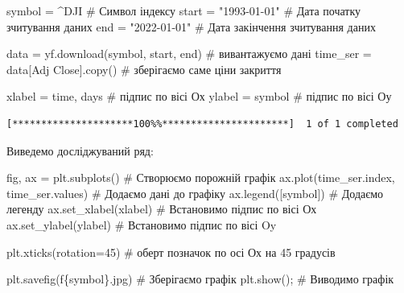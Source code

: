 \documentclass[
  letterpaper,
]{report}
\newenvironment{Shaded}{\begin{snugshade}}{\end{snugshade}}
\newcommand{\CommentTok}[1]{\textcolor[rgb]{0.37,0.37,0.37}{#1}}
\newcommand{\DecValTok}[1]{\textcolor[rgb]{0.68,0.00,0.00}{#1}}
\newcommand{\NormalTok}[1]{\textcolor[rgb]{0.00,0.23,0.31}{#1}}
\newcommand{\OperatorTok}[1]{\textcolor[rgb]{0.37,0.37,0.37}{#1}}
\newcommand{\SpecialCharTok}[1]{\textcolor[rgb]{0.37,0.37,0.37}{#1}}
\newcommand{\SpecialStringTok}[1]{\textcolor[rgb]{0.13,0.47,0.30}{#1}}
\newcommand{\StringTok}[1]{\textcolor[rgb]{0.13,0.47,0.30}{#1}}
\begin{document}
\begin{Shaded}
\begin{Highlighting}[]
\NormalTok{symbol }\OperatorTok{=} \StringTok{\textquotesingle{}\^{}DJI\textquotesingle{}}          \CommentTok{\# Символ індексу}
\NormalTok{start }\OperatorTok{=} \StringTok{"1993{-}01{-}01"}     \CommentTok{\# Дата початку зчитування даних}
\NormalTok{end }\OperatorTok{=} \StringTok{"2022{-}01{-}01"}       \CommentTok{\# Дата закінчення зчитування даних}

\NormalTok{data }\OperatorTok{=}\NormalTok{ yf.download(symbol, start, end)  }\CommentTok{\# вивантажуємо дані}
\NormalTok{time\_ser }\OperatorTok{=}\NormalTok{ data[}\StringTok{\textquotesingle{}Adj Close\textquotesingle{}}\NormalTok{].copy()     }\CommentTok{\# зберігаємо саме ціни закриття}

\NormalTok{xlabel }\OperatorTok{=} \StringTok{\textquotesingle{}time, days\textquotesingle{}}    \CommentTok{\# підпис по вісі Ох }
\NormalTok{ylabel }\OperatorTok{=}\NormalTok{ symbol          }\CommentTok{\# підпис по вісі Оу}
\end{Highlighting}
\end{Shaded}

\begin{verbatim}
[*********************100%%**********************]  1 of 1 completed
\end{verbatim}

Виведемо досліджуваний ряд:

\begin{Shaded}
\begin{Highlighting}[]
\NormalTok{fig, ax }\OperatorTok{=}\NormalTok{ plt.subplots()                   }\CommentTok{\# Створюємо порожній графік}
\NormalTok{ax.plot(time\_ser.index, time\_ser.values)   }\CommentTok{\# Додаємо дані до графіку}
\NormalTok{ax.legend([symbol])                        }\CommentTok{\# Додаємо легенду}
\NormalTok{ax.set\_xlabel(xlabel)                      }\CommentTok{\# Встановимо підпис по вісі Ох}
\NormalTok{ax.set\_ylabel(ylabel)                      }\CommentTok{\# Встановимо підпис по вісі Oy}

\NormalTok{plt.xticks(rotation}\OperatorTok{=}\DecValTok{45}\NormalTok{)                    }\CommentTok{\# оберт позначок по осі Ох на 45 градусів}

\NormalTok{plt.savefig(}\SpecialStringTok{f\textquotesingle{}}\SpecialCharTok{\{}\NormalTok{symbol}\SpecialCharTok{\}}\SpecialStringTok{.jpg\textquotesingle{}}\NormalTok{)               }\CommentTok{\# Зберігаємо графік }
\NormalTok{plt.show()}\OperatorTok{;}                                \CommentTok{\# Виводимо графік}
\end{Highlighting}
\end{Shaded}
\end{document}
